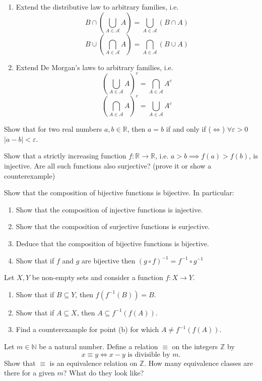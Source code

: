 \documentclass[11pt]{article}%
\begin{document}
\begin{Exercise}[title=**]
	\begin{enumerate}[label={\alph*)}]
		\item Extend the distributive law to arbitrary families, i.e.
		\[B\cap(\bigcup_{A\in\mathcal{A}}A) = \bigcup_{A\in\mathcal{A}}(B\cap A)\]
		\[B\cup(\bigcap_{A\in\mathcal{A}}A) = \bigcap_{A\in\mathcal{A}}(B\cup A)\]
		\item Extend De Morgan's laws to arbitrary families, i.e.
		\[(\bigcup_{A\in\mathcal{A}}A)^c = \bigcap_{A\in\mathcal{A}} A^c\]
		\[(\bigcap_{A\in\mathcal{A}}A)^c = \bigcup_{A\in\mathcal{A}} A^c\]
	\end{enumerate}
\end{Exercise}

\begin{Exercise}[title=*$\dagger$]
	Show that for two real numbers $a,b\in\mathbb R$, then $a=b$ if and only if ($\iff$) $\forall \varepsilon>0$ $|a-b|<\varepsilon$.
\end{Exercise}

\begin{Exercise}[title=**]
	Show that a strictly increasing function $f:\mathbb R \to \mathbb R$, i.e. $a>b \implies f(a)>f(b)$, is injective. Are all such functions also surjective? (prove it or show a counterexample)
\end{Exercise}

\begin{Exercise}[title=**$\dagger$]
	Show that the composition of bijective functions is bijective. In particular:
	\begin{enumerate}[label={\alph*)}]
		\item Show that the composition of injective functions is injective.
		\item Show that the composition of surjective functions is surjective.
		\item Deduce that the composition of bijective functions is bijective.
		\item Show that if $f$ and $g$ are bijective then $(g\circ f)^{-1}=f^{-1}\circ g^{-1}$
	\end{enumerate}
\end{Exercise}

\begin{Exercise}[title=**]
	Let $X,Y$ be non-empty sets and consider a function $f:X\to Y$.
	\begin{enumerate}[label={\alph*)}]
		\item Show that if $B\subseteq Y$, then $f(f^{-1}(B))=B$.
		\item Show that if $A\subseteq X$, then $A\subseteq f^{-1}(f(A))$.
		\item Find a counterexample for point (b) for which $A\neq f^{-1}(f(A))$.
	\end{enumerate}
\end{Exercise}

\begin{Exercise}[title=*]
	Let $m\in \mathbb N$ be a natural number. Define a relation $\equiv$ on the integers $\mathbb Z$ by
	\[x\equiv y\iff x-y\text{ is divisible by }m.\]
	Show that $\equiv$ is an equivalence relation on $\mathbb Z$. How many equivalence classes are there for a given $m$? What do they look like?
\end{Exercise}
\end{document}
